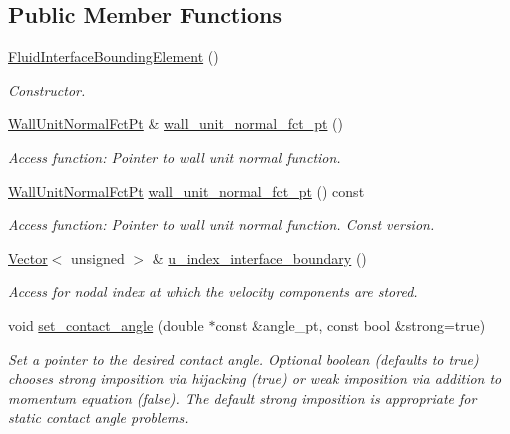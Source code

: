 \subsection*{Public Member Functions}
\begin{DoxyCompactItemize}
\item 
\hyperlink{classoomph_1_1FluidInterfaceBoundingElement_ab47dc01b830d4c405002e61a7205ca7c}{Fluid\+Interface\+Bounding\+Element} ()
\begin{DoxyCompactList}\small\item\em Constructor. \end{DoxyCompactList}\item 
\hyperlink{classoomph_1_1FluidInterfaceBoundingElement_a09c0b1df7d653eaf55e94e3951d409dd}{Wall\+Unit\+Normal\+Fct\+Pt} \& \hyperlink{classoomph_1_1FluidInterfaceBoundingElement_a3d8ea7b8e1f22eaaa1235231454b753c}{wall\+\_\+unit\+\_\+normal\+\_\+fct\+\_\+pt} ()
\begin{DoxyCompactList}\small\item\em Access function\+: Pointer to wall unit normal function. \end{DoxyCompactList}\item 
\hyperlink{classoomph_1_1FluidInterfaceBoundingElement_a09c0b1df7d653eaf55e94e3951d409dd}{Wall\+Unit\+Normal\+Fct\+Pt} \hyperlink{classoomph_1_1FluidInterfaceBoundingElement_a393601b322d0b8d6d2f86d07bd17550f}{wall\+\_\+unit\+\_\+normal\+\_\+fct\+\_\+pt} () const
\begin{DoxyCompactList}\small\item\em Access function\+: Pointer to wall unit normal function. Const version. \end{DoxyCompactList}\item 
\hyperlink{classoomph_1_1Vector}{Vector}$<$ unsigned $>$ \& \hyperlink{classoomph_1_1FluidInterfaceBoundingElement_ad74aadb79a88536e188fbff44f35cc02}{u\+\_\+index\+\_\+interface\+\_\+boundary} ()
\begin{DoxyCompactList}\small\item\em Access for nodal index at which the velocity components are stored. \end{DoxyCompactList}\item 
void \hyperlink{classoomph_1_1FluidInterfaceBoundingElement_a8566c5bed5c87717fcb155d398ed8c8f}{set\+\_\+contact\+\_\+angle} (double $\ast$const \&angle\+\_\+pt, const bool \&strong=true)
\begin{DoxyCompactList}\small\item\em Set a pointer to the desired contact angle. Optional boolean (defaults to true) chooses strong imposition via hijacking (true) or weak imposition via addition to momentum equation (false). The default strong imposition is appropriate for static contact angle problems. \end{DoxyCompactList}\item 

\end{DoxyCompactItemize}
